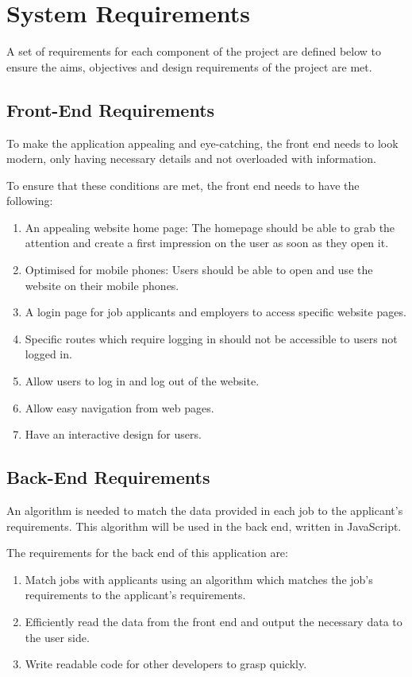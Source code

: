 \section{System Requirements}
A set of requirements for each component of the project are defined below to ensure the aims, objectives and design requirements of the project are met.

\subsection{Front-End Requirements}
To make the application appealing and eye-catching, the front end needs to look modern, only having necessary details and not overloaded with information.

To ensure that these conditions are met, the front end needs to have the \break following:
\begin{enumerate}
    \item An appealing website home page: The homepage should be able to grab the attention and create a first impression on the user as soon as they open it. 
    \item Optimised for mobile phones: Users should be able to open and use the website on their mobile phones.
    \item A login page for job applicants and employers to access specific website pages.
    \item Specific routes which require logging in should not be accessible to users not logged in.
    \item Allow users to log in and log out of the website.
    \item Allow easy navigation from web pages.
    \item Have an interactive design for users.
\end{enumerate}

\subsection{Back-End Requirements}
An algorithm is needed to match the data provided in each job to the applicant's requirements. This algorithm will be used in the back end, written in JavaScript.

The requirements for the back end of this application are:
\begin{enumerate}
    \item Match jobs with applicants using an algorithm which matches the job's requirements to the applicant's requirements.
    \item Efficiently read the data from the front end and output the necessary data to the user side.
    \item Write readable code for other developers to grasp quickly.
\end{enumerate}

